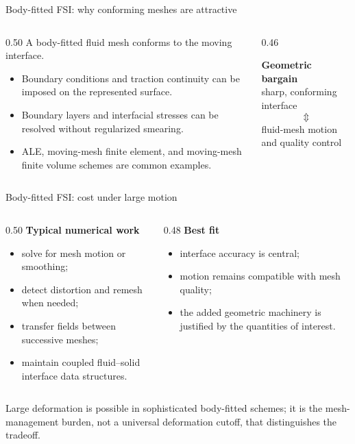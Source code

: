 \documentclass[aspectratio=169,11pt]{beamer}
\begin{document}
\begin{frame}{Body-fitted FSI: why conforming meshes are attractive}
\begin{columns}[T,onlytextwidth]
\begin{column}{0.50\textwidth}
A body-fitted fluid mesh conforms to the moving interface.
\begin{itemize}\itemsep6pt
  \item Boundary conditions and traction continuity can be imposed on the represented surface.
  \item Boundary layers and interfacial stresses can be resolved without regularized smearing.
  \item ALE, moving-mesh finite element, and moving-mesh finite volume schemes are common examples.
\end{itemize}
\end{column}
\begin{column}{0.46\textwidth}
\begin{punchbox}
\centering
\textbf{Geometric bargain}\\[5pt]
sharp, conforming interface
\[
\Updownarrow
\]
fluid-mesh motion and quality control
\end{punchbox}
\end{column}
\end{columns}
\end{frame}

\begin{frame}{Body-fitted FSI: cost under large motion}
\begin{columns}[T,onlytextwidth]
\begin{column}{0.50\textwidth}
\textbf{Typical numerical work}
\begin{itemize}\itemsep6pt
  \item solve for mesh motion or smoothing;
  \item detect distortion and remesh when needed;
  \item transfer fields between successive meshes;
  \item maintain coupled fluid--solid interface data structures.
\end{itemize}
\end{column}
\begin{column}{0.48\textwidth}
\textbf{Best fit}
\begin{itemize}\itemsep6pt
  \item interface accuracy is central;
  \item motion remains compatible with mesh quality;
  \item the added geometric machinery is justified by the quantities of interest.
\end{itemize}
\end{column}
\end{columns}
\begin{punchbox}
\small Large deformation is possible in sophisticated body-fitted schemes; it is the mesh-management burden, not a universal deformation cutoff, that distinguishes the tradeoff.
\end{punchbox}
\end{frame}
\end{document}
